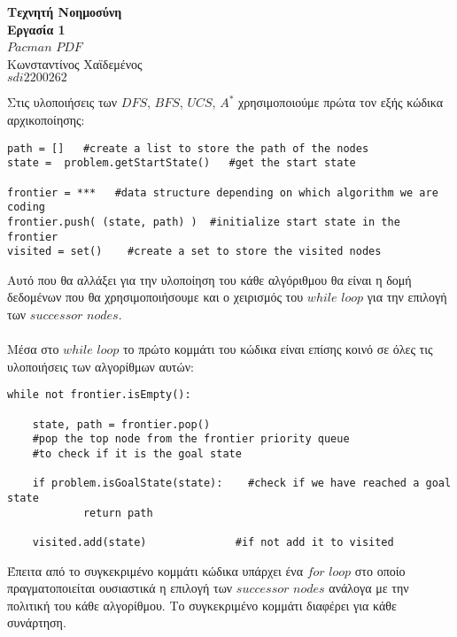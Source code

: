 \documentclass[12pt]{article}
\begin{document}
	\begin{center}
    	\huge \textbf{Τεχνητή Νοημοσύνη \\ Εργασία 1} \\ $Pacman$ $PDF$\\
    	\Large Κωνσταντίνος Χαϊδεμένος\\
    	\large $sdi2200262$\\ 
	\end{center}
\vspace{36pt}
Στις υλοποιήσεις των $DFS$, $BFS$, $UCS$, $Α^*$ χρησιμοποιούμε πρώτα τον εξής κώδικα αρχικοποίησης:\\
\begin{otherlanguage}{english}
\begin{verbatim}
path = []   #create a list to store the path of the nodes        
state =  problem.getStartState()   #get the start state

frontier = ***   #data structure depending on which algorithm we are coding  
frontier.push( (state, path) )  #initialize start state in the frontier    
visited = set()    #create a set to store the visited nodes
\end{verbatim}
\end{otherlanguage}
Αυτό που θα αλλάξει για την υλοποίηση του κάθε αλγόριθμου θα είναι η δομή δεδομένων που θα χρησιμοποιήσουμε και ο χειρισμός του $while$ $loop$ για την επιλογή των $successor$ $nodes$.\\\\
Μέσα στο $while$ $loop$ το πρώτο κομμάτι του κώδικα είναι επίσης κοινό σε όλες τις υλοποιήσεις των αλγορίθμων αυτών:
\begin{otherlanguage}{english}
\begin{verbatim}
while not frontier.isEmpty():

    state, path = frontier.pop()
    #pop the top node from the frontier priority queue
    #to check if it is the goal state
        
    if problem.isGoalState(state):    #check if we have reached a goal state
            return path

    visited.add(state)              #if not add it to visited
\end{verbatim}    
\end{otherlanguage}
Έπειτα από το συγκεκριμένο κομμάτι κώδικα υπάρχει ένα $for$ $loop$ στο οποίο πραγματοποιείται ουσιαστικά η επιλογή των $successor$ $nodes$ ανάλογα με την πολιτική του κάθε αλγορίθμου. Tο συγκεκριμένο κομμάτι διαφέρει για κάθε συνάρτηση.\\\\
\end{document}
